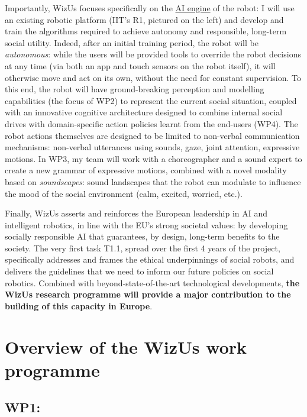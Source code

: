 \documentclass[11pt,a4paper]{report}
\newcommand{\project}{WizUs\xspace}
\begin{document}
Importantly, \project focuses specifically on the \ul{AI engine} of the robot: I
will use an existing robotic platform (IIT's R1, pictured on the left) and
develop and train the algorithms required to achieve autonomy and responsible,
long-term social utility. Indeed, after an initial training period, the robot
will be \emph{autonomous}: while the users will be provided tools to override
the robot decisions at any time (via both an app and touch sensors on the robot
itself), it will otherwise move and act on its own, without the need for
constant supervision. To this end, the robot will have ground-breaking
perception and modelling capabilities (the focus of WP2) to represent the
current social situation, coupled with an innovative cognitive architecture
designed to combine internal social drives with domain-specific action policies
learnt from the end-users (WP4). The robot actions themselves are designed to be
limited to non-verbal communication mechanisms: non-verbal utterances using
sounds, gaze, joint attention, expressive motions. In WP3, my team will work
with a choreographer and a sound expert to create a new grammar of expressive
motions, combined with a novel modality based on \emph{soundscapes}: sound
landscapes that the robot can modulate to influence the mood of the social
environment (calm, excited, worried, etc.).

Finally, \project asserts and reinforces the European leadership in AI and
intelligent robotics, in line with the EU's strong societal values: by developing
socially responsible AI that guarantees, by design, long-term benefits to the
society. The very first task T1.1, spread over the first 4 years of the project,
specifically addresses and frames the ethical underpinnings of social robots,
and delivers the guidelines that we need to inform our future policies on social
robotics. Combined with beyond-state-of-the-art technological developments,
\textbf{the \project research programme will provide a major contribution to the
building of this capacity in Europe}. 

\section{Overview of the \project work programme}


\subsection{WP1: \textbf{\wpOne}}
\end{document}
